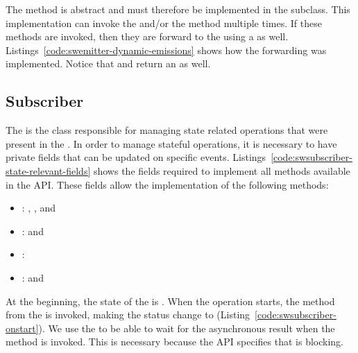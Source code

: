 \documentclass[type=bsc,accentcolor=tud9c]{tudthesis}
\begin{document}


The  method is abstract and must therefore be implemented in the subclass. This implementation can invoke the  and/or the  method multiple times. If these methods are invoked, then they are forward to the  using a  as well. Listings~\ref{code:swemitter-dynamic-emissions} shows how the forwarding was implemented. Notice that  and  return an  as well.



\subsection{Subscriber}
\label{sec:imp-subscriber}
The  is the class responsible for managing state related operations that were present in the . In order to manage stateful operations, it is necessary to have private fields that can be updated on specific events. Listings~\ref{code:swsubscriber-state-relevant-fields} shows the fields required to implement all methods available in the  API. These fields allow the implementation of the following methods:

\begin{itemize}
	\item {}: , ,  and 
	\item {}:  and 
	\item {}: 
	\item {}:  and 
\end{itemize}



At the beginning, the state of the  is . When the operation starts, the method  from the  is invoked, making the status change to  (Listing~\ref{code:swsubscriber-onstart}). We use the  to be able to wait for the asynchronous result when the  method is invoked. This is necessary because the  API specifies that  is blocking.
\end{document}
